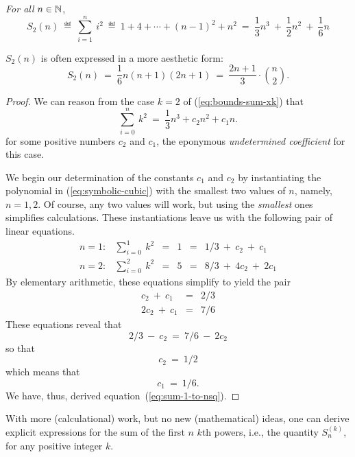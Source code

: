 \begin{prop}
{\em For all} $n \in \mathbb{N}$,
\begin{equation}
\label{eq:sum-1-to-nsq}
S_2(n) \ \eqdef \ \sum_{i=1}^n \ i^2 
 \ \eqdef \  1 + 4 + \cdots + (n-1)^2 + n^2
 \ = \ \frac{1}{3} n^3 \ + \ \frac{1}{2} n^2 \ + \ \frac{1}{6} n
\end{equation}
\end{prop}

$S_2(n)$ is often expressed in a more aesthetic form:
\[ S_2(n) \ = \
\frac{1}{6} n (n+1)(2n+1) \ = \
\frac{2n+1}{3} \cdot {n \choose 2}.
\]

\begin{proof}
We can reason from the case $k=2$ of (\ref{eq:bounds-sum-xk}) that
\begin{equation}
\label{eq:symbolic-cubic}
\sum_{i=0}^n \ k^2 \ = \ \frac{1}{3} n^3 + c_2 n^2 + c_1 n.
\end{equation}
for some positive numbers $c_2$ and $c_1$, the eponymous {\it
  undetermined coefficient} for this case.

We begin our determination of the constants $c_1$ and $c_2$ by
instantiating the polynomial in (\ref{eq:symbolic-cubic}) with the
smallest two values of $n$, namely, $n = 1,2$.  Of course, any two
values will work, but using the {\em smallest} ones simplifies
calculations.  These instantiations leave us with the following pair
of linear equations.
\[
\begin{array}{cccccl}
n=1: & \sum_{i=0}^1 \ k^2
   & = & 1 & = &
1/3 \ + \ c_2 \ + \ c_1 \\
n=2: & \sum_{i=0}^2 \ k^2
   & = & 5 & = &
8/3 \ + \ 4 c_2 \ + \ 2 c_1
\end{array}
\]
By elementary arithmetic, these equations simplify to yield the pair
\[
\begin{array}{ccc}
c_2 \ + \ c_1   & = & 2/3 \\
2 c_2 \ + \ c_1 & = & 7/6
\end{array}
\]
These equations reveal that
\[ 2/3 \ - \ c_2 \ = \ 7/6 \ - \ 2 c_2 \]
so that 
\[ c_2 \ = \ 1/2 \]
which means that
\[ c_1 \ = \ 1/6. \]
We have, thus, derived equation~(\ref{eq:sum-1-to-nsq}).  
\end{proof}

With more (calculational) work, but no new (mathematical) ideas, one
can derive explicit expressions for the sum of the first $n$ $k$th
powers, i.e., the quantity $S^{(k)}_n$, for any positive integer $k$.



